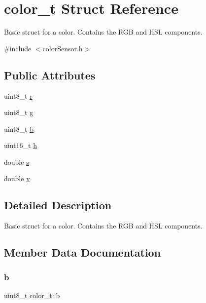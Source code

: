 \hypertarget{structcolor__t}{}\section{color\+\_\+t Struct Reference}
\label{structcolor__t}


Basic struct for a color. Contains the R\+GB and H\+SL components.  




{\ttfamily \#include $<$color\+Sensor.\+h$>$}

\subsection*{Public Attributes}
\begin{DoxyCompactItemize}
\item 
uint8\+\_\+t \hyperlink{structcolor__t_a9138f903c9036862cfeab970b156b62d}{r}
\item 
uint8\+\_\+t \hyperlink{structcolor__t_a7d1a9e3552401fc5f8882f6e0c2c82aa}{g}
\item 
uint8\+\_\+t \hyperlink{structcolor__t_a83c6c6015c8a0bf9e120dd88caf13bcd}{b}
\item 
uint16\+\_\+t \hyperlink{structcolor__t_aecabea8456e370c4aa010c7b2370c3c1}{h}
\item 
double \hyperlink{structcolor__t_a8363dde4b09ee0eafb24539ca0d6299e}{s}
\item 
double \hyperlink{structcolor__t_ab631e48b407098f1da43018e831cc5ad}{v}
\end{DoxyCompactItemize}


\subsection{Detailed Description}
Basic struct for a color. Contains the R\+GB and H\+SL components. 

\subsection{Member Data Documentation}
\mbox{\label{structcolor__t_a83c6c6015c8a0bf9e120dd88caf13bcd}} 
\subsubsection{\texorpdfstring{b}{b}}
{\footnotesize\ttfamily uint8\+\_\+t color\+\_\+t\+::b}


